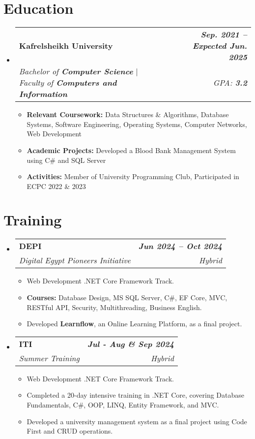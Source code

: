 \documentclass[letterpaper,11pt]{article}
\makeatletter
\newcommand{\resumeItem}[1]{
  \item\small{
    {#1 \vspace{-2pt}}
  }
}
\newcommand{\resumeSubheading}[4]{
  \vspace{-2pt}\item
    \begin{tabular*}{1.0\textwidth}[t]{l@{\extracolsep{\fill}}r}
      \textbf{#1} & \textbf{\small #2} \\
      \textit{\small#3} & {\small #4} \\
    \end{tabular*}\vspace{-7pt}
}
\newcommand{\resumeSubHeadingListStart}{\begin{itemize}[leftmargin=0.0in, label={}]}
\newcommand{\resumeSubHeadingListEnd}{\end{itemize}}
\newcommand{\resumeItemListStart}{\begin{itemize}}
\newcommand{\resumeItemListEnd}{\end{itemize}\vspace{-5pt}}
\makeatother
\begin{document}
\section{\LARGE Education}
\vspace{5pt}
  \resumeSubHeadingListStart
    \resumeSubheading
      {Kafrelsheikh University}{\textit{Sep. 2021 -- Expected Jun. 2025}}
      {Bachelor of \textbf{Computer Science} $|$ Faculty of \textbf{Computers and Information}}{\textit{GPA: \textbf{3.2}}}
      \resumeItemListStart
        \resumeItem{\textbf{Relevant Coursework:} Data Structures \& Algorithms, Database Systems, Software Engineering, Operating Systems, Computer Networks, Web Development}
        \resumeItem{\textbf{Academic Projects:} Developed a Blood Bank Management System using C\# and SQL Server}
        \resumeItem{\textbf{Activities:} Member of University Programming Club, Participated in ECPC 2022 \& 2023}
      \resumeItemListEnd
  \resumeSubHeadingListEnd
  \vspace{-15pt}
\section{\LARGE Training}
\vspace{5pt}
  \resumeSubHeadingListStart
    \resumeSubheading
      {DEPI}{\textit{Jun 2024 -- Oct 2024}}
      {Digital Egypt Pioneers Initiative}{\textit{Hybrid}}
      \resumeItemListStart
          \resumeItem{Web Development .NET Core Framework Track.}
          \vspace{-7pt}
          \resumeItem{\textbf{Courses:} Database Design, MS SQL Server, C\#, EF Core, MVC, RESTful API, Security, Multithreading, Business English.}
          \vspace{-18pt}
          \resumeItem{Developed \textbf{Learnflow}, an Online Learning Platform, as a final project.}
      \resumeItemListEnd
      \vspace{-10pt}
    \resumeSubheading{ITI}{\textit{Jul - Aug \& Sep 2024}}{Summer Training}{\textit{Hybrid}}
    \resumeItemListStart
        \resumeItem{Web Development .NET Core Framework Track.}
        \vspace{-7pt}
        \resumeItem{Completed a 20-day intensive training in .NET Core, covering Database 
        Fundamentals, C\#, OOP, LINQ, Entity Framework, and MVC.}
        \vspace{-7pt}
        \resumeItem{Developed a university management system as a final project using Code First and CRUD operations.}
    \resumeItemListEnd
  \resumeSubHeadingListEnd
  \vspace{-15pt}
\end{document}
